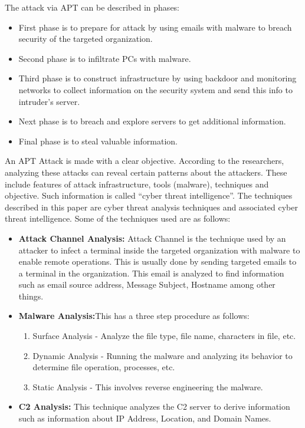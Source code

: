 \documentclass[11pt]{article}
\begin{document}
	The attack via APT can be described in phases:
	\begin{itemize}
		\item First phase is to prepare for attack by using emails with malware to breach security of the targeted organization.
		\item Second phase is to infiltrate PCs with malware.
		\item Third phase is to construct infrastructure by using backdoor and monitoring networks to collect information on the security system and send this info to intruder’s server.
		\item Next phase is to breach and explore servers to get additional information.
		\item Final phase is to steal valuable information.
	\end{itemize}
	An APT Attack is made with a clear objective. According to the researchers, analyzing these attacks can reveal certain patterns about the attackers. These include features of attack infrastructure, tools (malware), techniques and objective. Such information is called “cyber threat intelligence”. The techniques described in this paper are cyber threat analysis techniques and associated cyber threat intelligence. Some of the techniques used are as follows:
	\begin{itemize}
		\item \textbf{Attack Channel Analysis:} Attack Channel is the technique used by an attacker to infect a terminal inside the targeted organization with malware to enable remote operations. This is usually done by sending targeted emails to a terminal in the organization. This email is analyzed to find information such as email source address, Message Subject, Hostname among other things.
		\item \textbf{Malware Analysis:}This has a three step procedure as follows:
		\begin{enumerate}
			\item Surface Analysis - Analyze the file type, file name, characters in file, etc.
			\item Dynamic Analysis - Running the malware and analyzing its behavior to determine file operation, processes, etc.
			\item Static Analysis - This involves reverse engineering the malware.
		\end{enumerate}
		\item \textbf{C2 Analysis:}  This technique analyzes the C2 server to derive information such as information about IP Address, Location, and Domain Names.
	\end{itemize}
\end{document}
